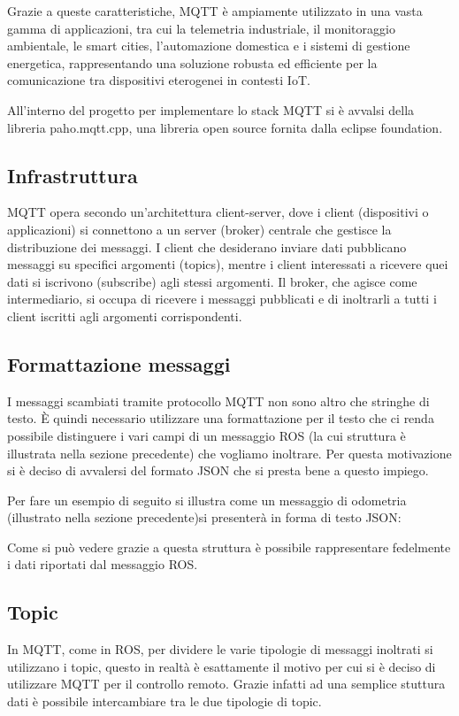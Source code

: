\noindent Grazie a queste caratteristiche, MQTT è ampiamente utilizzato in una vasta gamma di applicazioni, tra cui la telemetria industriale, il monitoraggio ambientale, le smart cities, l'automazione domestica e i sistemi di gestione energetica, rappresentando una soluzione robusta ed efficiente per la comunicazione tra dispositivi eterogenei in contesti IoT.

\noindent All'interno del progetto per implementare lo stack MQTT si è avvalsi della libreria paho.mqtt.cpp, una libreria open source fornita dalla eclipse foundation.

\subsection{Infrastruttura}
\noindent MQTT opera secondo un'architettura client-server, dove i client (dispositivi o applicazioni) si connettono a un server (broker) centrale che gestisce la distribuzione dei messaggi. I client che desiderano inviare dati pubblicano messaggi su specifici argomenti (topics), mentre i client interessati a ricevere quei dati si iscrivono (subscribe) agli stessi argomenti. Il broker, che agisce come intermediario, si occupa di ricevere i messaggi pubblicati e di inoltrarli a tutti i client iscritti agli argomenti corrispondenti.

\subsection{Formattazione messaggi}
I messaggi scambiati tramite protocollo MQTT non sono altro che stringhe di testo. È quindi necessario utilizzare una formattazione per il testo che ci renda possibile distinguere i vari campi di un messaggio ROS (la cui struttura è illustrata nella sezione precedente) che vogliamo inoltrare. Per questa motivazione si è deciso di avvalersi del formato JSON che si presta bene a questo impiego.

\noindent Per fare un esempio di seguito si illustra come un messaggio di odometria (illustrato nella sezione precedente)si presenterà in forma di testo JSON:

%


\noindent Come si può vedere grazie a questa struttura è possibile rappresentare fedelmente i dati riportati dal messaggio ROS.

\subsection{Topic}
In MQTT, come in ROS, per dividere le varie tipologie di messaggi inoltrati si utilizzano i topic, questo in realtà è esattamente il motivo per cui si è deciso di utilizzare MQTT per il controllo remoto. Grazie infatti ad una semplice stuttura dati è possibile intercambiare tra le due tipologie di topic.

